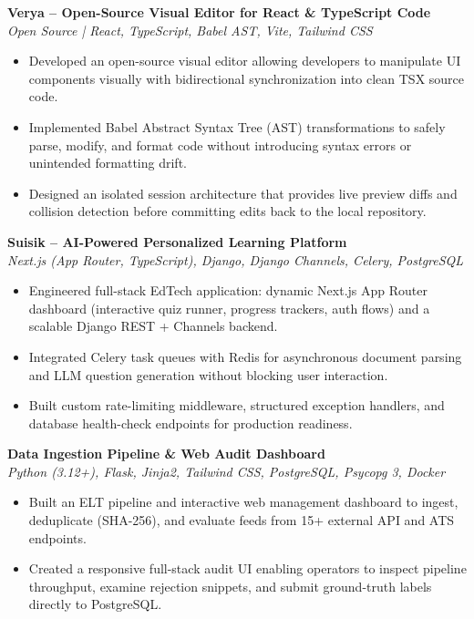 \documentclass[a4paper,10pt]{article}
\begin{document}
\textbf{Verya -- Open-Source Visual Editor for React \& TypeScript Code} \\
\textit{Open Source | React, TypeScript, Babel AST, Vite, Tailwind CSS}
\begin{itemize}
    \item Developed an open-source visual editor allowing developers to manipulate UI components visually with bidirectional synchronization into clean TSX source code.
    \item Implemented Babel Abstract Syntax Tree (AST) transformations to safely parse, modify, and format code without introducing syntax errors or unintended formatting drift.
    \item Designed an isolated session architecture that provides live preview diffs and collision detection before committing edits back to the local repository.
\end{itemize}

\vspace{3pt}
\textbf{Suisik -- AI-Powered Personalized Learning Platform} \\
\textit{Next.js (App Router, TypeScript), Django, Django Channels, Celery, PostgreSQL}
\begin{itemize}
    \item Engineered full-stack EdTech application: dynamic Next.js App Router dashboard (interactive quiz runner, progress trackers, auth flows) and a scalable Django REST + Channels backend.
    \item Integrated Celery task queues with Redis for asynchronous document parsing and LLM question generation without blocking user interaction.
    \item Built custom rate-limiting middleware, structured exception handlers, and database health-check endpoints for production readiness.
\end{itemize}

\vspace{3pt}
\textbf{Data Ingestion Pipeline \& Web Audit Dashboard} \\
\textit{Python (3.12+), Flask, Jinja2, Tailwind CSS, PostgreSQL, Psycopg 3, Docker}
\begin{itemize}
    \item Built an ELT pipeline and interactive web management dashboard to ingest, deduplicate (SHA-256), and evaluate feeds from 15+ external API and ATS endpoints.
    \item Created a responsive full-stack audit UI enabling operators to inspect pipeline throughput, examine rejection snippets, and submit ground-truth labels directly to PostgreSQL.
\end{itemize}
\end{document}
